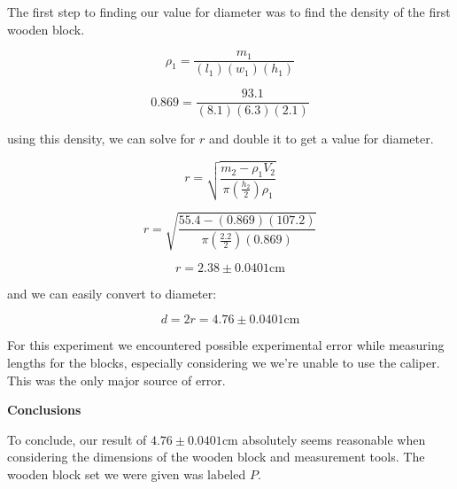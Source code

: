 \documentclass[12pt]{article}
\begin{document}
\vspace{1em}

The first step to finding our value for diameter was to find the
density of the first wooden block.

\[ \rho_1 = \frac{ m_1 } { (l_1) (w_1) (h_1) } \]

\[ 0.869 = \frac{ 93.1 } { (8.1) (6.3) (2.1) } \]

using this density, we can solve for $r$ and double it to get a value for diameter.

\[ r = \sqrt{ \frac{m_2 - \rho_1 V_2}{\pi ( \frac{h_2}{2} ) \rho_1} } \]

\[ r = \sqrt{ \frac{55.4 - (0.869) (107.2)}{\pi ( \frac{2.2}{2} ) (0.869)} } \]

\[ r = 2.38 \pm 0.0401 \text{cm} \]

and we can easily convert to diameter:

\[ d = 2r = 4.76 \pm 0.0401 \text{cm}\]

For this experiment we encountered possible experimental error while measuring
lengths for the blocks, especially considering we we're unable to use the
caliper. This was the only major source of error.

\vspace{1em}

\textbf{Conclusions}\vspace{1em}

To conclude, our result of $4.76 \pm 0.0401 \text{cm}$ absolutely seems reasonable when considering
the dimensions of the wooden block and measurement tools. The wooden block set we were given was labeled $P$.
\end{document}

